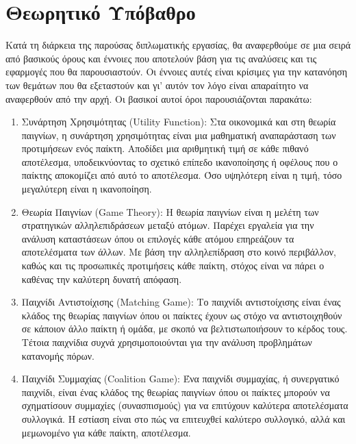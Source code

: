 \section{Θεωρητικό Υπόβαθρο}

Κατά τη διάρκεια της παρούσας διπλωματικής εργασίας, θα αναφερθούμε σε μια σειρά από βασικούς όρους και έννοιες που αποτελούν βάση για τις αναλύσεις και τις εφαρμογές που θα παρουσιαστούν. Οι έννοιες αυτές είναι κρίσιμες για την κατανόηση των θεμάτων που θα εξεταστούν και γι' αυτόν τον λόγο είναι απαραίτητο να αναφερθούν από την αρχή. Οι βασικοί αυτοί όροι παρουσιάζονται παρακάτω:

\begin{enumerate}
    \item Συνάρτηση Χρησιμότητας (Utility Function): Στα οικονομικά και στη θεωρία παιγνίων, η συνάρτηση χρησιμότητας είναι μια μαθηματική αναπαράσταση των προτιμήσεων ενός παίκτη. Αποδίδει μια αριθμητική τιμή σε κάθε πιθανό αποτέλεσμα, υποδεικνύοντας το σχετικό επίπεδο ικανοποίησης ή οφέλους που ο παίκτης αποκομίζει από αυτό το αποτέλεσμα. Όσο υψηλότερη είναι η τιμή, τόσο μεγαλύτερη είναι η ικανοποίηση. 

    \item Θεωρία Παιγνίων (Game Theory): Η θεωρία παιγνίων είναι η μελέτη των στρατηγικών αλληλεπιδράσεων μεταξύ ατόμων. Παρέχει εργαλεία για την ανάλυση καταστάσεων όπου οι επιλογές κάθε ατόμου επηρεάζουν τα αποτελέσματα των άλλων. Με βάση την αλληλεπίδραση στο κοινό περιβάλλον, καθώς και τις προσωπικές προτιμήσεις κάθε παίκτη, στόχος είναι να πάρει ο καθένας την καλύτερη δυνατή απόφαση. 

    \item Παιχνίδι Αντιστοίχισης (Matching Game): Το παιχνίδι αντιστοίχισης είναι ένας κλάδος της θεωρίας παιγνίων όπου οι παίκτες έχουν ως στόχο να αντιστοιχηθούν σε κάποιον άλλο παίκτη ή ομάδα, με σκοπό να βελτιστωποιήσουν το κέρδος τους. Τέτοια παιχνίδια συχνά χρησιμοποιούνται για την ανάλυση προβλημάτων κατανομής πόρων. 

    \item Παιχνίδι Συμμαχίας (Coalition Game): Ένα παιχνίδι συμμαχίας, ή συνεργατικό παιχνίδι, είναι ένας κλάδος της θεωρίας παιγνίων όπου οι παίκτες μπορούν να σχηματίσουν συμμαχίες (συνασπισμούς) για να επιτύχουν καλύτερα αποτελέσματα συλλογικά. Η εστίαση είναι στο πώς να επιτευχθεί καλύτερο συλλογικό, αλλά και μεμωνομένο για κάθε παίκτη, αποτέλεσμα. 


\end{enumerate}
